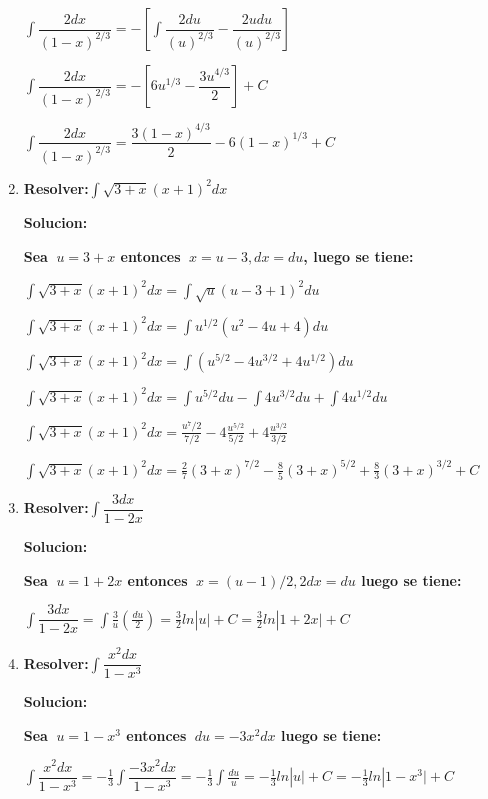 \documentclass[10pt,a4paper]{book}
\newcommand{\ds}{\displaystyle}
\begin{document}
\begin{enumerate}
        $\ds\int \dfrac{2dx}{(1-x)^{2/3}}=-\left[\int\dfrac{2du}{(u)^{2/3}}-\dfrac{2udu}{(u)^{2/3}}\right]$

        $\ds\int \dfrac{2dx}{(1-x)^{2/3}}=-\left[6u^{1/3}-\dfrac{3u^{4/3}}{2}\right]+C$

        $\ds\int \dfrac{2dx}{(1-x)^{2/3}}=\dfrac{3(1-x)^{4/3}}{2}-6(1-x)^{1/3}+C$

    \vspace{0.5cm}
    \item \textbf{Resolver:}$\ds\int \sqrt{3+x}(x+1)^2dx$ 

        \textbf{Solucion:}

        \textbf{Sea $\ds\ u=3+x$ entonces $\ds\ x=u-3,dx=du$, luego se tiene:}

        $\ds\int \sqrt{3+x}(x+1)^2dx=\int \sqrt{u}(u-3+1)^2du $ 

        $\ds\int \sqrt{3+x}(x+1)^2dx=\int u^{1/2}(u^2-4u+4)du$
        
        $\ds\int \sqrt{3+x}(x+1)^2dx=\int(u^{5/2}-4u^{3/2}+4u^{1/2})du$
        
        $\ds\int \sqrt{3+x}(x+1)^2dx=\int u^{5/2}du-\int 4u^{3/2}du+\int 4u^{1/2}du$ 

        $\ds\int \sqrt{3+x}(x+1)^2dx=\frac{u^7/2}{7/2}-4\frac{u^{5/2}}{5/2}+4\frac{u^{3/2}}{3/2}$ 

        $\ds\int \sqrt{3+x}(x+1)^2dx=\frac{2}{7}(3+x)^{7/2}-\frac{8}{5}(3+x)^{5/2}+\frac{8}{3}(3+x)^{3/2}+C$


        
     \vspace{0.5cm}
    \item \textbf{Resolver:}$\ds\int \dfrac{3dx}{1-2x}$

        \textbf{Solucion:}

        \textbf{Sea $\ds\ u=1+2x$ entonces $\ds\ x=(u-1)/2,2dx=du$ luego se tiene:}

        $\ds\int \dfrac{3dx}{1-2x}=\int\frac{3}{u}\left(\frac{du}{2}\right)=\frac{3}{2}ln|u\vert+C=\frac{3}{2}ln|1+2x \vert+C$




    \vspace{0.5cm}
    \item \textbf{Resolver:}$\ds\int\dfrac{x^2dx}{1-x^3}$
    
        \textbf{Solucion:}

        \textbf{Sea $\ds\ u=1-x^3$ entonces $\ds\ du=-3x^2dx$ luego se tiene:}

        $\ds\int\dfrac{x^2dx}{1-x^3}=-\frac{1}{3}\int \dfrac{-3x^2dx}{1-x^3}=-\frac{1}{3}\int\frac{du}{u}=-\frac{1}{3}ln|u\vert+C
        =-\frac{1}{3}ln|1-x^3\vert+C $


\end{enumerate}
\end{document}
